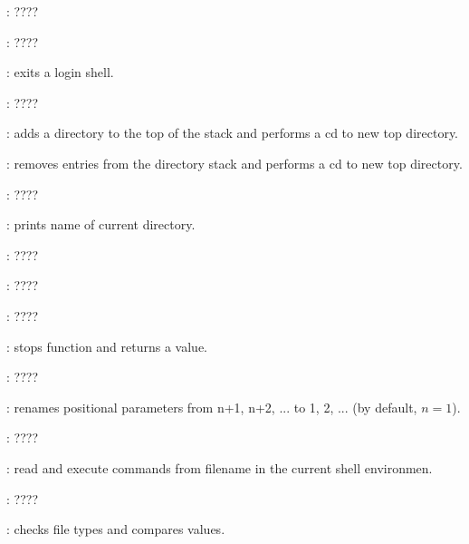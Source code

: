 \begin{compactenum}
\item [\symbolbash] : \dotfill ????

\item [\symbolbash] : \dotfill ????

\item [\symbolbash] : exits a login shell.

\item [\symbolbash] : \dotfill ????

\item [\symbolbash] : adds a directory to the top of the stack and performs a cd to new top directory.
\item [\symbolbash] : removes entries from the directory stack and performs a cd to new top directory.

\item [\symbolbash] : \dotfill ????

\item [\symbolbash] : prints name of current directory.

\item [\symbolbash] : \dotfill ????

\item [\symbolbash] : \dotfill ????

\item [\symbolbash] : \dotfill ????

\item [\symbolbash] : stops function and returns a value.

\item [\symbolbash] : \dotfill ????

\item [\symbolbash] : renames positional parameters from n+1, n+2, ... to 1, 2, ... (by default, $n = 1$).

\item [\symbolbash] : \dotfill ????

\item [\symbolbash] : read and execute commands from filename in the current shell environmen.

\item [\symbolbash] : \dotfill ????

\item [\symbolbash] : checks file types and compares values.


\end{compactenum}
